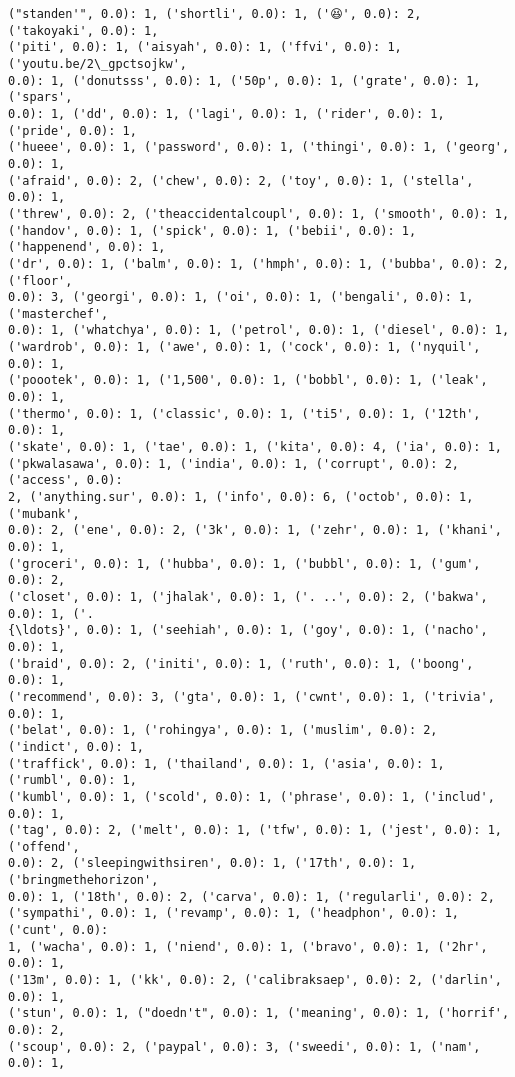 \documentclass[11pt]{article}
\begin{document}
\begin{Verbatim}[commandchars=\\\{\}]
("standen'", 0.0): 1, ('shortli', 0.0): 1, ('😆', 0.0): 2, ('takoyaki', 0.0): 1,
('piti', 0.0): 1, ('aisyah', 0.0): 1, ('ffvi', 0.0): 1, ('youtu.be/2\_gpctsojkw',
0.0): 1, ('donutsss', 0.0): 1, ('50p', 0.0): 1, ('grate', 0.0): 1, ('spars',
0.0): 1, ('dd', 0.0): 1, ('lagi', 0.0): 1, ('rider', 0.0): 1, ('pride', 0.0): 1,
('hueee', 0.0): 1, ('password', 0.0): 1, ('thingi', 0.0): 1, ('georg', 0.0): 1,
('afraid', 0.0): 2, ('chew', 0.0): 2, ('toy', 0.0): 1, ('stella', 0.0): 1,
('threw', 0.0): 2, ('theaccidentalcoupl', 0.0): 1, ('smooth', 0.0): 1,
('handov', 0.0): 1, ('spick', 0.0): 1, ('bebii', 0.0): 1, ('happenend', 0.0): 1,
('dr', 0.0): 1, ('balm', 0.0): 1, ('hmph', 0.0): 1, ('bubba', 0.0): 2, ('floor',
0.0): 3, ('georgi', 0.0): 1, ('oi', 0.0): 1, ('bengali', 0.0): 1, ('masterchef',
0.0): 1, ('whatchya', 0.0): 1, ('petrol', 0.0): 1, ('diesel', 0.0): 1,
('wardrob', 0.0): 1, ('awe', 0.0): 1, ('cock', 0.0): 1, ('nyquil', 0.0): 1,
('poootek', 0.0): 1, ('1,500', 0.0): 1, ('bobbl', 0.0): 1, ('leak', 0.0): 1,
('thermo', 0.0): 1, ('classic', 0.0): 1, ('ti5', 0.0): 1, ('12th', 0.0): 1,
('skate', 0.0): 1, ('tae', 0.0): 1, ('kita', 0.0): 4, ('ia', 0.0): 1,
('pkwalasawa', 0.0): 1, ('india', 0.0): 1, ('corrupt', 0.0): 2, ('access', 0.0):
2, ('anything.sur', 0.0): 1, ('info', 0.0): 6, ('octob', 0.0): 1, ('mubank',
0.0): 2, ('ene', 0.0): 2, ('3k', 0.0): 1, ('zehr', 0.0): 1, ('khani', 0.0): 1,
('groceri', 0.0): 1, ('hubba', 0.0): 1, ('bubbl', 0.0): 1, ('gum', 0.0): 2,
('closet', 0.0): 1, ('jhalak', 0.0): 1, ('. ..', 0.0): 2, ('bakwa', 0.0): 1, ('.
{\ldots}', 0.0): 1, ('seehiah', 0.0): 1, ('goy', 0.0): 1, ('nacho', 0.0): 1,
('braid', 0.0): 2, ('initi', 0.0): 1, ('ruth', 0.0): 1, ('boong', 0.0): 1,
('recommend', 0.0): 3, ('gta', 0.0): 1, ('cwnt', 0.0): 1, ('trivia', 0.0): 1,
('belat', 0.0): 1, ('rohingya', 0.0): 1, ('muslim', 0.0): 2, ('indict', 0.0): 1,
('traffick', 0.0): 1, ('thailand', 0.0): 1, ('asia', 0.0): 1, ('rumbl', 0.0): 1,
('kumbl', 0.0): 1, ('scold', 0.0): 1, ('phrase', 0.0): 1, ('includ', 0.0): 1,
('tag', 0.0): 2, ('melt', 0.0): 1, ('tfw', 0.0): 1, ('jest', 0.0): 1, ('offend',
0.0): 2, ('sleepingwithsiren', 0.0): 1, ('17th', 0.0): 1, ('bringmethehorizon',
0.0): 1, ('18th', 0.0): 2, ('carva', 0.0): 1, ('regularli', 0.0): 2,
('sympathi', 0.0): 1, ('revamp', 0.0): 1, ('headphon', 0.0): 1, ('cunt', 0.0):
1, ('wacha', 0.0): 1, ('niend', 0.0): 1, ('bravo', 0.0): 1, ('2hr', 0.0): 1,
('13m', 0.0): 1, ('kk', 0.0): 2, ('calibraksaep', 0.0): 2, ('darlin', 0.0): 1,
('stun', 0.0): 1, ("doedn't", 0.0): 1, ('meaning', 0.0): 1, ('horrif', 0.0): 2,
('scoup', 0.0): 2, ('paypal', 0.0): 3, ('sweedi', 0.0): 1, ('nam', 0.0): 1,

\end{Verbatim}
\end{document}
